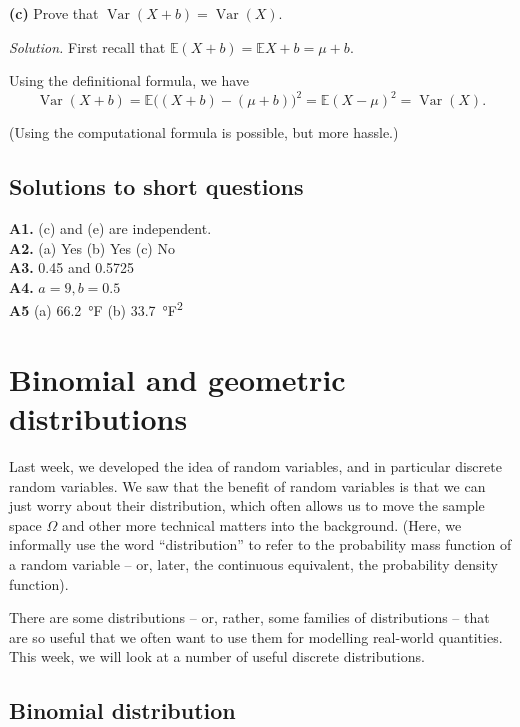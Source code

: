 \documentclass[
  a4paper,
]{book}
\theoremstyle{definition}
\theoremstyle{definition}
\theoremstyle{definition}
\theoremstyle{definition}
\theoremstyle{remark}
\begin{document}
\textbf{(c)} Prove that \(\operatorname{Var}(X+b) = \operatorname{Var}(X)\).

\begin{myanswers}
\emph{Solution.}
First recall that \(\mathbb E(X + b) = \mathbb EX + b = \mu + b\).

Using the definitional formula, we have
\[ \operatorname{Var}(X + b) = \mathbb E\big((X + b) - (\mu + b)\big)^2 = \mathbb E(X - \mu)^2 = \operatorname{Var}(X) . \]

(Using the computational formula is possible, but more hassle.)

\end{myanswers}

\hypertarget{P3-short-sols}{%
\section*{Solutions to short questions}\label{P3-short-sols}}

\textbf{A1.} (c) and (e) are independent.\\
\textbf{A2.} (a) Yes (b) Yes (c) No\\
\textbf{A3.} 0.45 and 0.5725\\
\textbf{A4.} \(a = 9, b = 0.5\)\\
\textbf{A5} (a) 66.2~°F (b) 33.7~°F\textsuperscript{2}

\hypertarget{L11-binomial-poisson}{%
\chapter{Binomial and geometric distributions}\label{L11-binomial-poisson}}

Last week, we developed the idea of random variables, and in particular discrete random variables. We saw that the benefit of random variables is that we can just worry about their distribution, which often allows us to move the sample space \(\Omega\) and other more technical matters into the background. (Here, we informally use the word ``distribution'' to refer to the probability mass function of a random variable -- or, later, the continuous equivalent, the probability density function).

There are some distributions -- or, rather, some families of distributions -- that are so useful that we often want to use them for modelling real-world quantities. This week, we will look at a number of useful discrete distributions.

\hypertarget{binomial}{%
\section{Binomial distribution}\label{binomial}}
\end{document}
